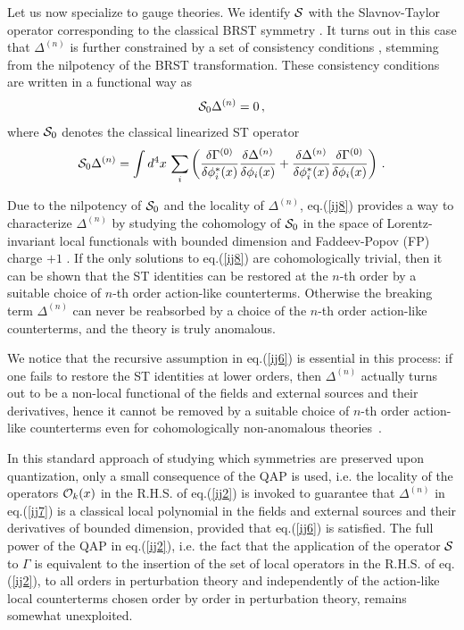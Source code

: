 \documentclass[a4paper,11pt]{article}
\def\G{\Gamma}
\begin{document}
Let us now specialize to gauge theories. We identify
${\cal S}$ with the Slavnov-Taylor operator corresponding to 
the classical BRST symmetry \cite{BRST}.
It turns out in this case that $\Delta^{(n)}$ is further constrained by
a set of consistency conditions \cite{wz}, stemming from
the nilpotency of the BRST transformation.
These consistency conditions are written in a functional way
as
%
\begin{eqnarray}
{\cal S}_0 \Delta^{(n)}=0 \, ,
\label{ij8}
\end{eqnarray}
%
where ${\cal S}_0$ denotes the classical linearized
ST operator
%
\begin{eqnarray}
{\cal S}_0 \Delta^{(n)}
= \int d^4x \, \sum_i \left (
{\delta \G^{(0)} \over \delta \phi^*_i(x)} 
{\delta \Delta^{(n)} \over \delta \phi_i(x)}
+ 
{\delta \Delta^{(n)} \over \delta \phi^*_i(x)} 
{\delta \Gamma^{(0)} \over \delta \phi_i(x)} 
\right ) \, .
\label{ij9}
\end{eqnarray}
%

Due to the nilpotency of ${\cal S}_0$
and  the locality of $\Delta^{(n)}$, eq.(\ref{ij8})
provides a way to characterize $\Delta^{(n)}$ by studying
the cohomology of ${\cal S}_0$ in the space of 
Lorentz-invariant local
functionals with bounded dimension and Faddeev-Popov (FP) charge $+1$ 
\cite{PS}.
If the only solutions to eq.(\ref{ij8}) are cohomologically trivial,
then it can be shown that the ST identities can be restored at the $n$-th order
by a suitable choice of $n$-th order action-like counterterms.
Otherwise the breaking term $\Delta^{(n)}$ can never be reabsorbed
by a choice of the $n$-th order action-like counterterms, and the theory
is truly anomalous.

We notice that the recursive assumption in eq.(\ref{ij6}) is essential in this process:
if one fails to restore the ST identities at lower orders,
then $\Delta^{(n)}$ actually turns out to be a non-local
functional of the fields and external sources and their
derivatives, hence it cannot be removed by a suitable
choice of $n$-th order action-like counterterms even
for cohomologically non-anomalous theories~\cite{pq}.

In this standard approach of studying which symmetries are
preserved upon quantization, only a small consequence
of the QAP is used, i.e. the locality of the operators
${\cal O}_k(x)$ in the R.H.S. of eq.(\ref{ij2}) is invoked
 to guarantee that $\Delta^{(n)}$
in eq.(\ref{ij7}) is a classical local  polynomial in the fields and external sources and their
derivatives of bounded dimension, provided that eq.(\ref{ij6}) is satisfied.
The full power of the QAP in eq.(\ref{ij2}), i.e. the
fact that the application of the operator ${\cal S}$ to $\G$
is equivalent to the insertion of the set of local operators
 in the R.H.S. of eq.(\ref{ij2}),
to all orders in perturbation theory  and independently
of the action-like local counterterms chosen order by order
in perturbation theory, remains somewhat unexploited.
\end{document}
